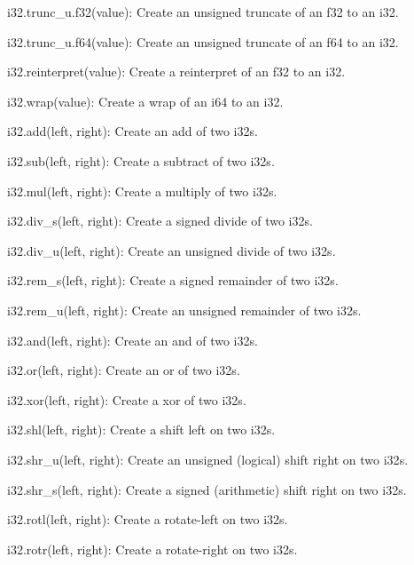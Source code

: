 \begin{DoxyItemize}
\begin{DoxyItemize}
\item {\ttfamily i32.\+trunc\+\_\+u.\+f32(value)}\+: Create an unsigned truncate of an {\ttfamily f32} to an {\ttfamily i32}.
\item {\ttfamily i32.\+trunc\+\_\+u.\+f64(value)}\+: Create an unsigned truncate of an {\ttfamily f64} to an {\ttfamily i32}.
\item {\ttfamily i32.\+reinterpret(value)}\+: Create a reinterpret of an {\ttfamily f32} to an {\ttfamily i32}.
\item {\ttfamily i32.\+wrap(value)}\+: Create a wrap of an {\ttfamily i64} to an {\ttfamily i32}.
\item {\ttfamily i32.\+add(left, right)}\+: Create an add of two {\ttfamily i32}s.
\item {\ttfamily i32.\+sub(left, right)}\+: Create a subtract of two {\ttfamily i32}s.
\item {\ttfamily i32.\+mul(left, right)}\+: Create a multiply of two {\ttfamily i32}s.
\item {\ttfamily i32.\+div\+\_\+s(left, right)}\+: Create a signed divide of two {\ttfamily i32}s.
\item {\ttfamily i32.\+div\+\_\+u(left, right)}\+: Create an unsigned divide of two {\ttfamily i32}s.
\item {\ttfamily i32.\+rem\+\_\+s(left, right)}\+: Create a signed remainder of two {\ttfamily i32}s.
\item {\ttfamily i32.\+rem\+\_\+u(left, right)}\+: Create an unsigned remainder of two {\ttfamily i32}s.
\item {\ttfamily i32.\+and(left, right)}\+: Create an and of two {\ttfamily i32}s.
\item {\ttfamily i32.\+or(left, right)}\+: Create an or of two {\ttfamily i32}s.
\item {\ttfamily i32.\+xor(left, right)}\+: Create a xor of two {\ttfamily i32}s.
\item {\ttfamily i32.\+shl(left, right)}\+: Create a shift left on two {\ttfamily i32}s.
\item {\ttfamily i32.\+shr\+\_\+u(left, right)}\+: Create an unsigned (logical) shift right on two {\ttfamily i32}s.
\item {\ttfamily i32.\+shr\+\_\+s(left, right)}\+: Create a signed (arithmetic) shift right on two {\ttfamily i32}s.
\item {\ttfamily i32.\+rotl(left, right)}\+: Create a rotate-\/left on two {\ttfamily i32}s.
\item {\ttfamily i32.\+rotr(left, right)}\+: Create a rotate-\/right on two {\ttfamily i32}s.

\end{DoxyItemize}
\end{DoxyItemize}
